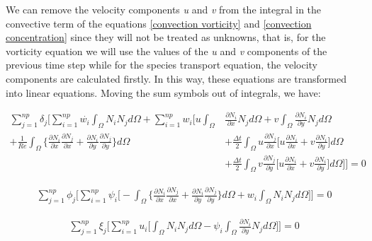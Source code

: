 We can remove the velocity components \textit{u} and \textit{v} 
from the integral in the convective term of 
the equations \ref{convection vorticity} and 
\ref{convection concentration} since they will not be treated as 
unknowns, that is, for the vorticity equation we will use 
the values of the \textit{u} and \textit{v} components 
of the previous time step while for the species transport equation, 
the velocity components are calculated firstly. 
In this way, these equations are transformed into linear equations.
Moving the sum symbols out of integrals, we have:

\begin{equation}
 \begin{aligned} 
  \sum\limits_{j=1}^{np} \delta_j \Bigg[
  \sum\limits_{i=1}^{np} \overset{.}{w_i} \int_{\Omega} N_i N_j d\Omega 
   + \sum\limits_{i=1}^{np} w_i \Bigg[
    u \int_{\Omega} & \frac{\partial N_i}{\partial x} N_j d\Omega 
  + v \int_{\Omega} \frac{\partial N_i}{\partial y} N_j d\Omega
  \\[5pt]
  + \frac{1}{\textit{Re}} \int_{\Omega} \Bigg\{ 
                    \frac{\partial N_i}{\partial x} 
                    \frac{\partial N_j}{\partial x} 
   +                 \frac{\partial N_i}{\partial y} 
                    \frac{\partial N_j}{\partial y} 
  \Bigg\} d\Omega
 & + \frac{\Delta t}{2} \int_{\Omega} u \frac{\partial N_j}{\partial x}
 \Bigg[
   u \frac{\partial N_i}{\partial x}
 + v \frac{\partial N_i}{\partial y}
 \Bigg] d\Omega
 \\[5pt]
 & + \frac{\Delta t}{2} \int_{\Omega} v \frac{\partial N_j}{\partial y}
 \Bigg[
   u \frac{\partial N_i}{\partial x}
 + v \frac{\partial N_i}{\partial y}
 \Bigg] d\Omega
 \Bigg] \Bigg] = 0
 \end{aligned}
\end{equation}

\begin{equation}
 \begin{aligned}
  \sum\limits_{j=1}^{np} \phi_j \Bigg[
  \sum\limits_{i=1}^{np} \psi_i \Bigg[
  - \int_{\Omega} \Bigg\{ 
                  \frac{\partial N_i}{\partial x} 
                  \frac{\partial N_j}{\partial x} 
  +               \frac{\partial N_i}{\partial y} 
                  \frac{\partial N_j}{\partial y} 
  \Bigg\} d\Omega
  + w_i \int_{\Omega} N_i N_j d\Omega
  \Bigg] \Bigg] = 0
 \end{aligned}
\end{equation}

\begin{equation}
 \begin{aligned}
  \sum\limits_{j=1}^{np} \xi_j \Bigg[
  \sum\limits_{i=1}^{np} u_i \Bigg[
   \int_{\Omega} N_i N_j d\Omega
 - \psi_i \int_{\Omega} \frac{\partial N_i}{\partial y} N_j d\Omega
  \Bigg] \Bigg] = 0
 \end{aligned}
\end{equation}

